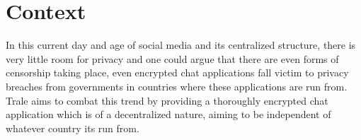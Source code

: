 \chapter{Context}\label{ch:context}

In this current day and age of social media and its centralized structure, there is very little room for privacy and
one could argue that there are even forms of censorship taking place, even encrypted chat applications fall victim to
privacy breaches from governments in countries where these applications are run from.
Trale aims to combat this trend by providing a thoroughly encrypted chat application which is of a decentralized
nature, aiming to be independent of whatever country its run from.
